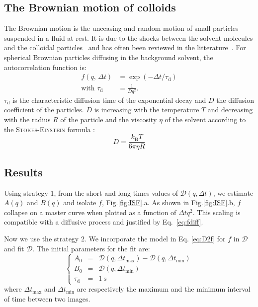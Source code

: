 \documentclass[prb,twocolumn,amsmath,amssymb]{revtex4-1}
\begin{document}
\subsection{The Brownian motion of colloids}
The Brownian motion is the unceasing and random motion of small particles suspended in a fluid at rest. It is due to the shocks between the solvent molecules and the colloidal particles~\cite{13_brown1828brief,9_einstein1906theory, 14_sutherland1905lxxv, 10_von1906kinetischen,ajp1997lemons,22_perrin2014atomes} and has often been reviewed in the litterature~\cite{ajp1997lemons,Nelson2004, ajp2006newburgh, ajp2006bergstein, Pearle2010}. For spherical Brownian particles  diffusing in the  background solvent, the autocorrelation function is\cite{18_sartor2003dynamic, ajp1999goldburg,ajp1969clark,8_berne2000dynamic}:
\begin{align}
f(q, \, \Delta t) &= \exp(-\Delta t/\tau_\text{d})
\label{eq:fdiff}\\
\text{with }\tau_\text{d} &= \frac{1}{Dq^2}.
\label{eq:relax}
\end{align}
$\tau_\text{d}$ is the characteristic diffusion time of the exponential decay and $D$ the diffusion coefficient of the particles. $D$ is increasing with the temperature $T$ and decreasing with the radius $R$ of the particle and the viscosity $\eta$ of the solvent according to the \textsc{Stokes-Einstein} formula \cite{Nelson2004, 16_CollSusp, ajp1997lemons, ajp2007jia}:
\begin{equation}
D = \frac{k_\text{B} T}{6 \pi \eta R}
\label{eq:se}
\end{equation}

\subsection{Results}
\label{sec:resultcolloid}
Using strategy 1, from the short and long times values of $\mathcal{D}(q,\Delta t)$, we estimate $A(q)$ and $B(q)$ and isolate $f$, Fig.\ref{fig:ISF}.a. As shown in  Fig.\ref{fig:ISF}.b, $f$ collapse on a master curve when plotted as a function of $\Delta t q^2$. This scaling is compatible with a diffusive process and justified by Eq.~\ref{eq:fdiff}. 

Now we use the strategy 2. We incorporate the model in Eq. \eqref{eq:D2f} for $f$ in $\mathcal{D}$ and fit $\mathcal{D}$. The initial parameters for the fit are:
\begin{equation}
\left\{
\begin{array}{rcl}
A_0 &=& \mathcal{D} (q,\Delta t_\text{max}) - \mathcal{D} (q,\Delta t_\text{min}) \\
B_0 &=& \mathcal{D} (q,\Delta t_\text{min}) \\
\tau_\text{d} &=& \SI{1}{\second}
\end{array}
\right.
\end{equation}
where $\Delta t_\text{max}$ and $\Delta t_\text{min}$ are respectively the maximum and the minimum interval of time between two images.
\end{document}

